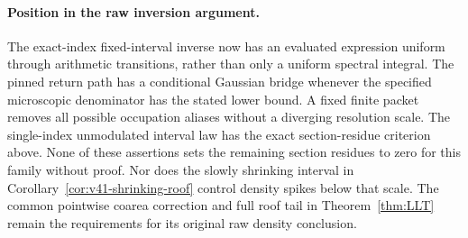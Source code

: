 \paragraph{Position in the raw inversion argument.}
The exact-index fixed-interval inverse now has an evaluated expression
uniform through arithmetic transitions, rather than only a uniform
spectral integral. The pinned return path has a conditional Gaussian
bridge whenever the specified microscopic denominator has the stated
lower bound. A fixed finite packet removes all possible occupation
aliases without a diverging resolution scale. The single-index
unmodulated interval law has the exact section-residue criterion above.
None of these assertions sets the remaining section residues to zero
for this family without proof. Nor does the slowly shrinking interval
in Corollary~\ref{cor:v41-shrinking-roof} control density spikes below
that scale. The common pointwise coarea correction and full roof tail
in Theorem~\ref{thm:LLT} remain the requirements for its original raw
density conclusion.

